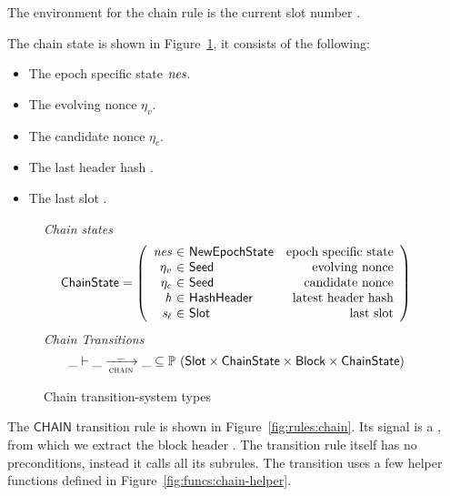 The environment for the chain rule is the current slot number .

The chain state is shown in Figure~\ref{fig:ts-types:chain}, it consists of the
following:

\begin{itemize}
  \item The epoch specific state $\mathit{nes}$.
  \item The evolving nonce $\eta_v$.
  \item The candidate nonce $\eta_c$.
  \item The last header hash .
  \item The last slot .
\end{itemize}

\begin{figure}
  \emph{Chain states}
  \begin{equation*}
    \ChainState =
    \left(
      \begin{array}{r@{~\in~}lr}
        \var{nes} & \NewEpochState & \text{epoch specific state} \\
        ~\eta_v & \Seed & \text{evolving nonce} \\
        ~\eta_c & \Seed & \text{candidate nonce} \\
        \var{h} & \HashHeader & \text{latest header hash} \\
        \var{s_\ell} & \Slot & \text{last slot} \\
      \end{array}
    \right)
  \end{equation*}
  \emph{Chain Transitions}
  \begin{equation*}
    \_ \vdash \var{\_} \trans{chain}{\_} \var{\_} \subseteq
    \powerset (\Slot \times \ChainState \times \Block \times \ChainState)
  \end{equation*}
  \caption{Chain transition-system types}
  \label{fig:ts-types:chain}
\end{figure}

The $\mathsf{CHAIN}$ transition rule is shown in
Figure~\ref{fig:rules:chain}. Its signal is a , from which
we extract the block header .
The transition rule itself has no preconditions, instead it calls all its subrules.
The transition uses a few helper functions defined in Figure~\ref{fig:funcs:chain-helper}.

